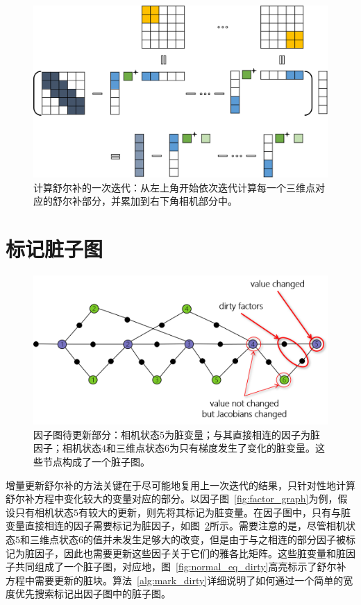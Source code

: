 \begin{figure}[htb!]
    \centering
    \includegraphics[width=\textwidth]{Pictures/schur_complement.png}
    \caption{计算舒尔补的一次迭代：从左上角开始依次迭代计算每一个三维点对应的舒尔补部分，并累加到右下角相机部分中。}
    \label{fig:schur_complement}
\end{figure}

\section{标记脏子图}

\begin{figure}[htb!]
    \centering
    \includegraphics[scale=.7]{Pictures/factor_graph_dirty.png}
    \caption{因子图待更新部分：相机状态$5$为脏变量；与其直接相连的因子为脏因子；相机状态$4$和三维点状态$6$为只有梯度发生了变化的脏变量。这些节点构成了一个脏子图。}
    \label{fig:factor_graph_dirty}
\end{figure}

增量更新舒尔补的方法关键在于尽可能地复用上一次迭代的结果，只针对性地计算舒尔补方程中变化较大的变量对应的部分。以因子图~\ref{fig:factor_graph}为例，假设只有相机状态$5$有较大的更新，则先将其标记为脏变量。在因子图中，只有与脏变量直接相连的因子需要标记为脏因子，如图~\ref{fig:factor_graph_dirty}所示。需要注意的是，尽管相机状态$5$和三维点状态$6$的值并未发生足够大的改变，但是由于与之相连的部分因子被标记为脏因子，因此也需要更新这些因子关于它们的雅各比矩阵。这些脏变量和脏因子共同组成了一个脏子图，对应地，图~\ref{fig:normal_eq_dirty}高亮标示了舒尔补方程中需要更新的脏块。算法~\ref{alg:mark_dirty}详细说明了如何通过一个简单的宽度优先搜索标记出因子图中的脏子图。

